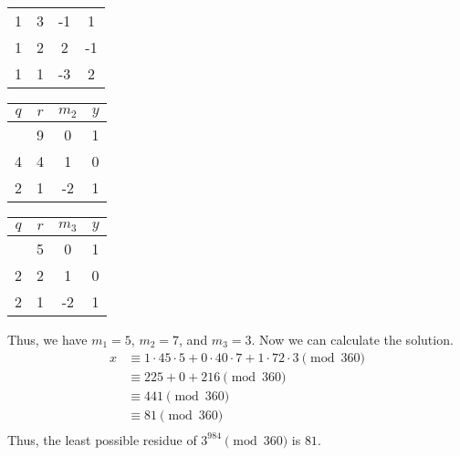 \documentclass{article}
\begin{document}
\begin{solution}{}{}
\begin{center}
\begin{tabular}{c c c c}
            1 & 3 & -1 & 1 \\
            1 & 2 & 2 & -1 \\
            1 & 1 & -3 & 2 \\
        \end{tabular}
        \quad
        \begin{tabular}{c c c c}
            $q$ & $r$ & $m_2$ & $y$ \\
            \hline
            & 9 & 0 & 1 \\
            4 & 4 & 1 & 0 \\
            2 & 1 & -2 & 1 \\
        \end{tabular}
        \quad
        \begin{tabular}{c c c c}
            $q$ & $r$ & $m_3$ & $y$ \\
            \hline
            & 5 & 0 & 1 \\
            2 & 2 & 1 & 0 \\
            2 & 1 & -2 & 1 \\
        \end{tabular}
    \end{center}
    Thus, we have $m_1=5$, $m_2=7$, and $m_3=3$. Now we can calculate the solution.
    \begin{align*}
        x &\equiv 1\cdot45\cdot5 + 0\cdot40\cdot7 + 1\cdot72\cdot3 \pmod{360} \\
        &\equiv 225 + 0 + 216 \pmod{360} \\
        &\equiv 441 \pmod{360} \\
        &\equiv 81 \pmod{360} \\
    \end{align*}
    Thus, the least possible residue of $3^{984} \pmod{360}$ is $81$.
\end{solution}
\end{document}
